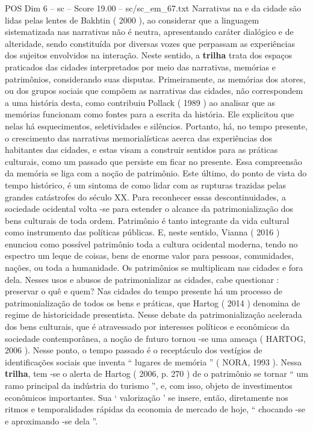 \begin{textsample}{POS Dim 6 – sc – Score 19.00 – sc/sc\_em\_67.txt}
Narrativas na e da cidade são lidas pelas lentes de Bakhtin ( 2000 ), ao considerar que a linguagem sistematizada nas narrativas não é neutra, apresentando caráter dialógico e de alteridade, sendo constituída por diversas vozes que perpassam as experiências dos sujeitos envolvidos na interação.
Neste sentido, a \textbf{trilha} trata dos espaços praticados das cidades interpretados por meio das narrativas, memórias e patrimônios, considerando suas disputas.
Primeiramente, as memórias dos atores, ou dos grupos sociais que compõem as narrativas das cidades, não correspondem a uma história desta, como contribuiu Pollack ( 1989 ) ao analisar que as memórias funcionam como fontes para a escrita da história.
Ele explicitou que nelas há esquecimentos, seletividades e silêncios.
Portanto, há, no tempo presente, o crescimento das narrativas memorialísticas acerca das experiências dos habitantes das cidades, e estas visam a construir sentidos para as práticas culturais, como um passado que persiste em ficar no presente.
Essa compreensão da memória se liga com a noção de patrimônio.
Este último, do ponto de vista do tempo histórico, é um sintoma de como lidar com as rupturas trazidas pelas grandes catástrofes do século XX.
Para reconhecer essas descontinuidades, a sociedade ocidental volta -se para estender o alcance da patrimonialização dos bens culturais de toda ordem.
Patrimônio é tanto integrante da vida cultural como instrumento das políticas públicas.
E, neste sentido, Vianna ( 2016 ) enunciou como possível patrimônio toda a cultura ocidental moderna, tendo no espectro um leque de coisas, bens de enorme valor para pessoas, comunidades, nações, ou toda a humanidade.
Os patrimônios se multiplicam nas cidades e fora dela.
Nesses usos e abusos de patrimonializar as cidades, cabe questionar : preservar o quê e quem?
Nas cidades do tempo presente há um processo de patrimonialização de todos os bens e práticas, que Hartog ( 2014 ) denomina de regime de historicidade presentista.
Nesse debate da patrimonialização acelerada dos bens culturais, que é atravessado por interesses políticos e econômicos da sociedade contemporânea, a noção de futuro tornou -se uma ameaça ( HARTOG, 2006 ).
Nesse ponto, o tempo passado é o receptáculo dos vestígios de identificações sociais que inventa “ lugares de memória ” ( NORA, 1993 ).
Nessa \textbf{trilha}, tem -se o alerta de Hartog ( 2006, p. 270 ) de o patrimônio se tornar “ um ramo principal da indústria do turismo ”, e, com isso, objeto de investimentos econômicos importantes.
Sua ‘ valorização ’ se insere, então, diretamente nos ritmos e temporalidades rápidas da economia de mercado de hoje, “ chocando -se e aproximando -se dela ”.

\end{textsample}
